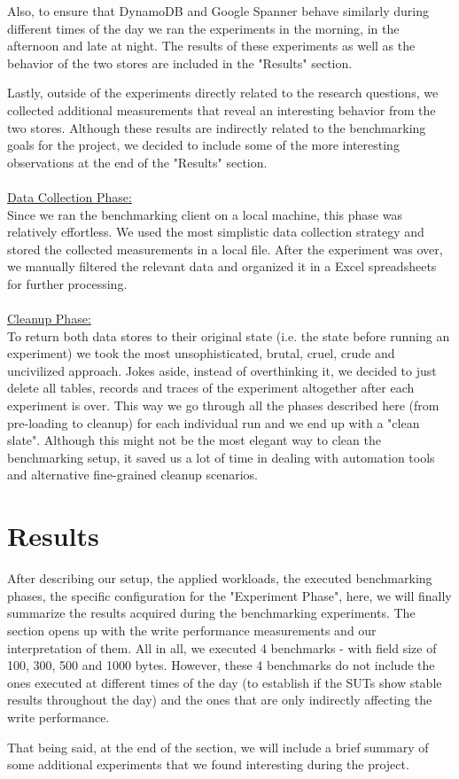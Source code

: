\documentclass[letterpaper, 10 pt, conference]{ieeeconf}  %
\begin{document}
Also, to ensure that DynamoDB and Google Spanner behave similarly during different times of the day we ran the experiments in the morning, in the afternoon and late at night. The results of these experiments as well as the behavior of the two stores are included in the "Results" section. \par
Lastly, outside of the experiments directly related to the research questions, we collected additional measurements that reveal an interesting behavior from the two stores. Although these results are indirectly related to the benchmarking goals for the project, we decided to include some of the more interesting observations at the end of the "Results" section.
\\
\\
\underline{Data Collection Phase:}
\\
Since we ran the benchmarking client on a local machine, this phase was relatively effortless. We used the most simplistic data collection strategy and stored the collected measurements in a local file. After the experiment was over, we manually filtered the relevant data and organized it in a Excel spreadsheets for further processing.
\\
\\
\underline{Cleanup Phase:}
\\
To return both data stores to their original state (i.e. the state before running an experiment) we took the most unsophisticated, brutal, cruel, crude and uncivilized approach. Jokes aside, instead of overthinking it, we decided to just delete all tables, records and traces of the experiment altogether after each experiment is over. This way we go through all the phases described here (from pre-loading to cleanup) for each individual run and we end up with a "clean slate". Although this might not be the most elegant way to clean the benchmarking setup, it saved us a lot of time in dealing with automation tools and alternative fine-grained cleanup scenarios. 

\section{Results}
After describing our setup, the applied workloads, the executed benchmarking phases, the specific configuration for the "Experiment Phase", here, we will finally summarize the results acquired during the benchmarking experiments. The section opens up with the write performance measurements and our interpretation of them. All in all, we executed 4 benchmarks - with field size of 100, 300, 500 and 1000 bytes. However, these 4 benchmarks do not include the ones executed at different times of the day (to establish if the SUTs show stable results throughout the day) and the ones that are only indirectly affecting the write performance. \par
That being said, at the end of the section, we will include a brief summary of some additional experiments that we found interesting during the project.
\end{document}
